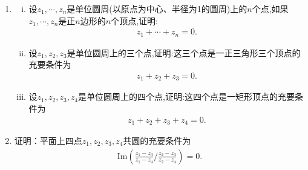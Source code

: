 \documentclass[../../main.tex]{subfiles}%
\begin{document}
\begin{proposition}[复数的几何性质]
\begin{enumerate}[(1)]
\item \begin{enumerate}[(i)]
\item 设$z_1,\cdots,z_n$是单位圆周(以原点为中心、半径为1的圆周)上的$n$个点,如果$z_1,\cdots,z_n$是正$n$边形的$n$个顶点,证明:
\begin{align*}
z_1+\cdots+z_n=0.
\end{align*}

\item 设$z_1,z_2,z_3$是单位圆周上的三个点,证明:这三个点是一正三角形三个顶点的充要条件为
\begin{align*}
z_1 + z_2 + z_3 = 0.
\end{align*}

\item 设$z_1,z_2,z_3,z_4$是单位圆周上的四个点,证明:这四个点是一矩形顶点的充要条件为
\begin{align*}
z_1 + z_2 + z_3 + z_4 = 0.
\end{align*}
\end{enumerate}

\item 证明：平面上四点\(z_1, z_2, z_3, z_4\)共圆的充要条件为
\begin{align}\label{equation:::::-------1111.11}
\mathrm{Im}\left( \frac{z_1 - z_3}{z_1 - z_4} \bigg/ \frac{z_2 - z_3}{z_2 - z_4} \right) = 0.
\end{align}
\end{enumerate}
\end{proposition}
\end{document}
